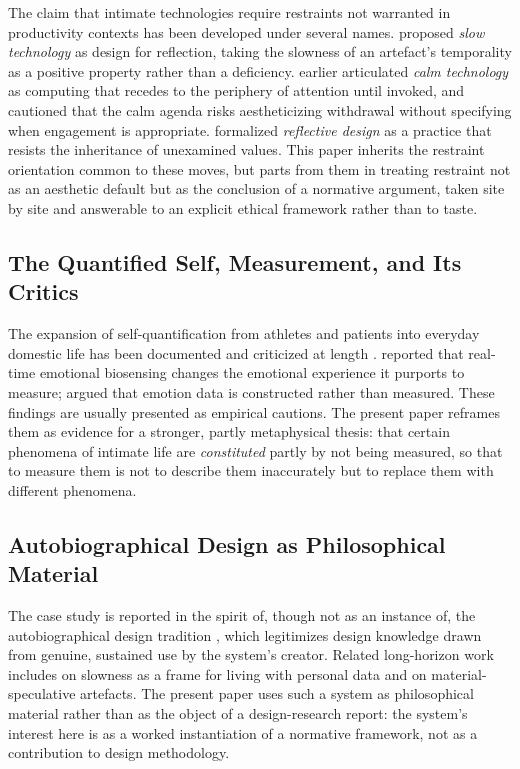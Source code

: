 \documentclass[11pt,a4paper]{article}
\begin{document}
The claim that intimate technologies require restraints not warranted in productivity contexts has been developed under several names. \textcite{hallnas2001slow} proposed \emph{slow technology} as design for reflection, taking the slowness of an artefact's temporality as a positive property rather than a deficiency. \textcite{weiser1996calm} earlier articulated \emph{calm technology} as computing that recedes to the periphery of attention until invoked, and \textcite{rogers2006moving} cautioned that the calm agenda risks aestheticizing withdrawal without specifying when engagement is appropriate. \textcite{sengers2005reflective} formalized \emph{reflective design} as a practice that resists the inheritance of unexamined values. This paper inherits the restraint orientation common to these moves, but parts from them in treating restraint not as an aesthetic default but as the conclusion of a normative argument, taken site by site and answerable to an explicit ethical framework rather than to taste.

\subsection{The Quantified Self, Measurement, and Its Critics}

The expansion of self-quantification from athletes and patients into everyday domestic life has been documented and criticized at length \parencite{lupton2016quantified}. \textcite{howell2018emotional} reported that real-time emotional biosensing changes the emotional experience it purports to measure; \textcite{boehner2007how} argued that emotion data is constructed rather than measured. These findings are usually presented as empirical cautions. The present paper reframes them as evidence for a stronger, partly metaphysical thesis: that certain phenomena of intimate life are \emph{constituted} partly by not being measured, so that to measure them is not to describe them inaccurately but to replace them with different phenomena.

\subsection{Autobiographical Design as Philosophical Material}

The case study is reported in the spirit of, though not as an instance of, the autobiographical design tradition \parencite{neustaedter2012autobiographical}, which legitimizes design knowledge drawn from genuine, sustained use by the system's creator. Related long-horizon work includes \textcite{odom2018slow} on slowness as a frame for living with personal data and \textcite{wakkary2017morse} on material-speculative artefacts. The present paper uses such a system as philosophical material rather than as the object of a design-research report: the system's interest here is as a worked instantiation of a normative framework, not as a contribution to design methodology.
\end{document}
